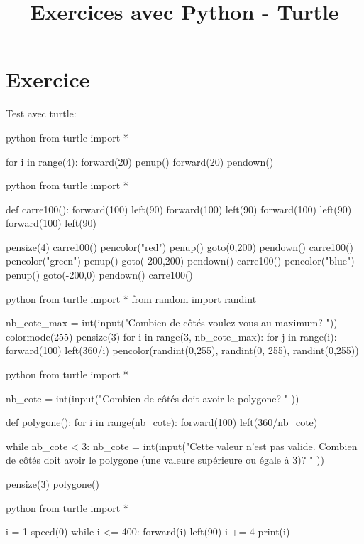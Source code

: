 \documentclass[a4paper,11pt]{article}
\begin{document}
\title{Exercices avec Python - Turtle}
\date{}
\maketitle

\section{Exercice}
Test avec turtle:\\
\begin{solution}
\begin{code}{python}
from turtle import *

for i in range(4):
    forward(20)
    penup()
    forward(20)
    pendown()
\end{code}
\end{solution}

\begin{solution}
\begin{code}{python}
from turtle import *

def carre100():
    forward(100)
    left(90)
    forward(100)
    left(90)
    forward(100)
    left(90)
    forward(100)
    left(90)

pensize(4)
carre100()
pencolor("red")
penup()
goto(0,200)
pendown()
carre100()
pencolor("green")
penup()
goto(-200,200)
pendown()
carre100()
pencolor("blue")
penup()
goto(-200,0)
pendown()
carre100()
\end{code}
\end{solution}

\begin{solution}
\begin{code}{python}
from turtle import *
from random import randint

nb_cote_max = int(input("Combien de côtés voulez-vous au maximum? "))
colormode(255)
pensize(3)
for i in range(3, nb_cote_max):
    for j in range(i):
        forward(100)
        left(360/i)
    pencolor(randint(0,255), randint(0, 255), randint(0,255))
\end{code}
\end{solution}

\begin{solution}
\begin{code}{python}
from turtle import *

nb_cote = int(input("Combien de côtés doit avoir le polygone? " ))

def polygone():
    for i in range(nb_cote):
        forward(100)
        left(360/nb_cote)

while nb_cote < 3:
    nb_cote = int(input("Cette valeur n'est pas valide. Combien de côtés doit avoir le polygone (une valeure supérieure ou égale à 3)? " ))

pensize(3)
polygone()
\end{code}
\end{solution}

\begin{solution}
\begin{code}{python}
from turtle import *

i = 1
speed(0)
while i <= 400:
    forward(i)
    left(90)
    i += 4
    print(i)
\end{code}
\end{solution}
\end{document}
